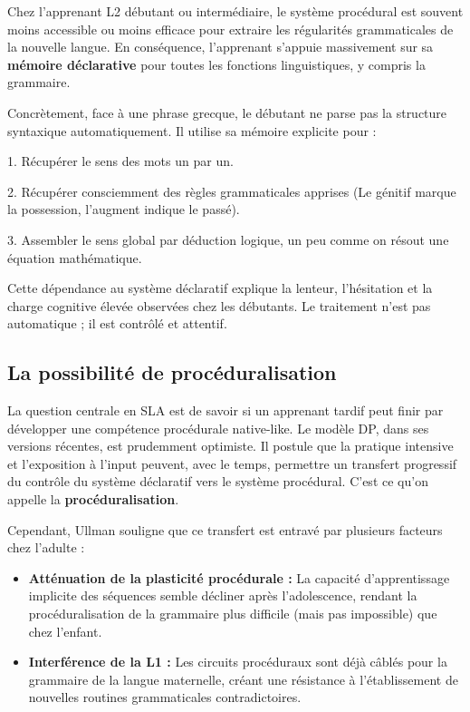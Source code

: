 Chez l'apprenant L2 débutant ou intermédiaire, le système procédural est souvent moins accessible ou
moins efficace pour extraire les régularités grammaticales de la nouvelle langue. En conséquence,
l'apprenant s'appuie massivement sur sa \textbf{mémoire déclarative} pour toutes les fonctions
linguistiques, y compris la grammaire.

Concrètement, face à une phrase grecque, le débutant ne \og parse\fg{} pas la structure syntaxique
automatiquement. Il utilise sa mémoire explicite pour :

1. Récupérer le sens des mots un par un.

2. Récupérer consciemment des règles grammaticales apprises (\og Le génitif marque la
possession\fg{}, \og l'augment indique le passé\fg{}).

3. Assembler le sens global par déduction logique, un peu comme on résout une équation mathématique.

Cette dépendance au système déclaratif explique la lenteur, l'hésitation et la charge cognitive
élevée observées chez les débutants. Le traitement n'est pas automatique ; il est contrôlé et
attentif.



\subsection{La possibilité de procéduralisation}

La question centrale en SLA est de savoir si un apprenant tardif peut finir par développer une
compétence procédurale native-like. Le modèle DP, dans ses versions récentes, est prudemment
optimiste. Il postule que la pratique intensive et l'exposition à l'input peuvent, avec le temps,
permettre un transfert progressif du contrôle du système déclaratif vers le système procédural.
C'est ce qu'on appelle la \textbf{procéduralisation}.

Cependant, Ullman souligne que ce transfert est entravé par plusieurs facteurs chez l'adulte :

\begin{itemize}\item \textbf{Atténuation de la plasticité procédurale :} La capacité d'apprentissage implicite des séquences semble décliner après l'adolescence, rendant la procéduralisation de la grammaire plus difficile (mais pas impossible) que chez l'enfant.\item \textbf{Interférence de la L1 :} Les circuits procéduraux sont déjà \og câblés\fg{} pour la grammaire de la langue maternelle, créant une résistance à l'établissement de nouvelles routines grammaticales contradictoires.\end{itemize}

